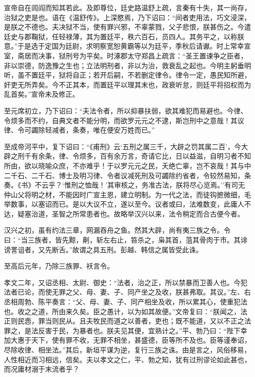 \documentclass[]{article}
\begin{document}
宣帝自在闾阎而知其若此。及即尊位，廷史路温舒上疏，言秦有十失，其一尚存，治狱之吏是也。语在《温舒传》。上深愍焉，乃下诏曰：``间者吏用法，巧文浸深，是朕之不德也。夫决狱不当，使有罪兴邪，不辜蒙戮，父子悲恨，朕甚伤之。今遣廷史与郡鞠狱，任轻禄薄，其为置廷平，秩六百石，员四人。其务平之，以称朕意。''于是选于定国为廷尉，求明察宽恕黄霸等以为廷平，季秋后请谳。时上常幸宣室，斋居而决事，狱刑号为平矣。时涿郡太守郑昌上疏言：``圣王置谏争之臣者，非以崇德，防逸豫之生也；立法明刑者，非以为治，救衰乱之起也。今明主躬垂明听，虽不置廷平，狱将自正；若开后嗣，不若删定律令。律令一定，愚民知所避，奸吏无所弄矣。今不正其本，而置廷平以理其末也，政衰听怠，则廷平将招权而为乱首矣。''宣帝未及修正。

至元席初立，乃下诏曰：``夫法令者，所以抑暴扶弱，欲其难犯而易避也。今律、令烦多而不约，自典文者不能分明，而欲罗元元之不逮，斯岂刑中之意哉！其议律、令可蠲除轻减者，条奏，唯在便安万姓而已。''

至成帝河平中，复下诏曰：``《甫刑》云`五刑之属三千，大辟之罚其属二百'，今大辟之刑千有余条，律、令烦多，百有余万言，奇请它比，日以益滋，自明习者不知所由，欲以晓喻众庶，不亦难乎！于以罗元元之民，夭绝亡辜，岂不哀哉！其与中二千石、二千石、博士及明习律、令者议减死刑及可蠲除约省者，令较然易知，条奏。《书》不云乎？`惟刑之恤哉！'其审核之，务准古法，朕将尽心览焉。''有司无仲山父将明之材，不能因时广宣主恩，建立明制。为一代之法，而徒钩摭微细，毛举数事，以塞诏而已。是以大议不立，遂以至今。议者或曰，法难数变，此庸人不达，疑塞治道，圣智之所常患者也。故略举汉兴以来，法令稍定而合古便今者。

汉兴之初，虽有约法三章，网漏吞舟之鱼。然其大辟，尚有夷三族之令。令曰：``当三族者，皆先黥，劓，斩左右止，笞杀之，枭其首，菹其骨肉于市。其诽谤詈诅者，又先断舌。''故谓之具五刑。彭越、韩信之属皆受此诛。

至高后元年，乃除三族罪、袄言令。

孝文二年，又诏丞相、太尉、御史：``法者，治之正，所以禁暴而卫善人也。今犯法者已论，而使无罪之父、母、妻、子、同产坐之及收，朕甚弗取。其议。''左、右丞相周勃、陈平奏言：``父、母、妻、子、同产相坐及收，所以累其心，使重犯法也。收之之道，所由来久矣。臣之愚计，以为如其故便。''文帝复曰：``朕闻之，法正则民悫，罪当则民从。且夫牧民而道之以善者，吏也；既不能道，又以不正之法罪之，是法反害于民，为暴者也。朕夫见其便，宜熟计之。''平、勃乃曰：``陛下幸加大惠于天下，使有罪不收，无罪不相坐，甚盛德，臣等所不及也。臣等谨奉诏，尽除收律、相坐法。''其后，新垣平谋为逆，复行三族之诛。由是言之，风俗移易，人性相近而习相远，信矣。夫以孝文之仁，平、勃之知，犹有过刑谬论如此甚也，而况庸材溺于末流者乎？
\end{document}
